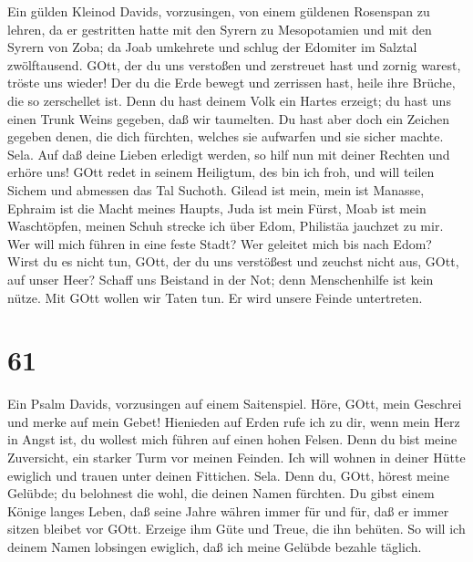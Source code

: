  Ein gülden Kleinod Davids, vorzusingen, von einem güldenen
Rosenspan zu lehren,  da er gestritten hatte mit den Syrern
zu Mesopotamien und mit den Syrern von Zoba; da Joab umkehrete und
schlug der Edomiter im Salztal zwölftausend.  GOtt, der du
uns verstoßen und zerstreuet hast und zornig warest, tröste uns wieder!
 Der du die Erde bewegt und zerrissen hast, heile ihre
Brüche, die so zerschellet ist.  Denn du hast deinem Volk
ein Hartes erzeigt; du hast uns einen Trunk Weins gegeben, daß wir
taumelten.  Du hast aber doch ein Zeichen gegeben denen, die
dich fürchten, welches sie aufwarfen und sie sicher machte. Sela.
 Auf daß deine Lieben erledigt werden, so hilf nun mit
deiner Rechten und erhöre uns!  GOtt redet in seinem
Heiligtum, des bin ich froh, und will teilen Sichem und abmessen das Tal
Suchoth.  Gilead ist mein, mein ist Manasse, Ephraim ist die
Macht meines Haupts, Juda ist mein Fürst,  Moab ist mein
Waschtöpfen, meinen Schuh strecke ich über Edom, Philistäa jauchzet zu
mir.  Wer will mich führen in eine feste Stadt? Wer
geleitet mich bis nach Edom?  Wirst du es nicht tun, GOtt,
der du uns verstößest und zeuchst nicht aus, GOtt, auf unser Heer?
 Schaff uns Beistand in der Not; denn Menschenhilfe ist
kein nütze.  Mit GOtt wollen wir Taten tun. Er wird unsere
Feinde untertreten.

\hypertarget{section-60}{%
\section{61}\label{section-60}}

 Ein Psalm Davids, vorzusingen auf einem Saitenspiel.
 Höre, GOtt, mein Geschrei und merke auf mein Gebet!
 Hienieden auf Erden rufe ich zu dir, wenn mein Herz in
Angst ist, du wollest mich führen auf einen hohen Felsen. 
Denn du bist meine Zuversicht, ein starker Turm vor meinen Feinden.
 Ich will wohnen in deiner Hütte ewiglich und trauen unter
deinen Fittichen. Sela.  Denn du, GOtt, hörest meine
Gelübde; du belohnest die wohl, die deinen Namen fürchten. 
Du gibst einem Könige langes Leben, daß seine Jahre währen immer für und
für,  daß er immer sitzen bleibet vor GOtt. Erzeige ihm Güte
und Treue, die ihn behüten.  So will ich deinem Namen
lobsingen ewiglich, daß ich meine Gelübde bezahle täglich.

